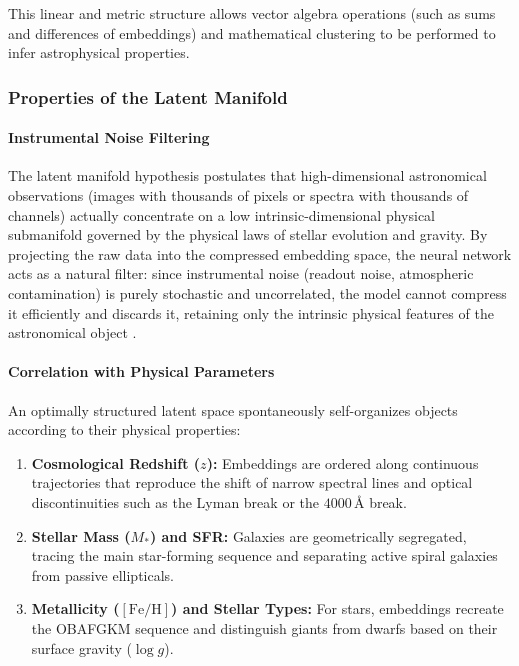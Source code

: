 This linear and metric structure allows vector algebra operations (such as sums and differences of embeddings) and mathematical clustering to be performed to infer astrophysical properties.

\subsubsection{Properties of the Latent Manifold}

\paragraph{Instrumental Noise Filtering}
The latent manifold hypothesis \autocites{ar:bengio-2013}{ar:fefferman-2016} postulates that high-dimensional astronomical observations (images with thousands of pixels or spectra with thousands of channels) actually concentrate on a low intrinsic-dimensional physical submanifold governed by the physical laws of stellar evolution and gravity. By projecting the raw data into the compressed embedding space, the neural network acts as a natural filter: since instrumental noise (readout noise, atmospheric contamination) is purely stochastic and uncorrelated, the model cannot compress it efficiently and discards it, retaining only the intrinsic physical features of the astronomical object \autocite{ar:portillo-2020}.

\paragraph{Correlation with Physical Parameters}
An optimally structured latent space spontaneously self-organizes objects according to their physical properties:
\begin{enumerate}
\item \textbf{Cosmological Redshift ($z$):} Embeddings are ordered along continuous trajectories that reproduce the shift of narrow spectral lines and optical discontinuities such as the Lyman break or the $4000\,\text{\AA}$ break.
\item \textbf{Stellar Mass ($M_*$) and \gls{SFR}:} Galaxies are geometrically segregated, tracing the main star-forming sequence and separating active spiral galaxies from passive ellipticals.
\item \textbf{Metallicity ($\left[\text{Fe/H}\right]$) and Stellar Types:} For stars, embeddings recreate the OBAFGKM sequence and distinguish giants from dwarfs based on their surface gravity ($\log g$).
\end{enumerate}

